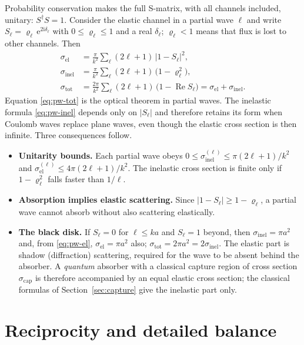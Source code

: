 \documentclass[11pt,a4paper]{book}
\numberwithin{equation}{chapter}
\newcommand{\ii}{\mathrm{i}}
\newcommand{\ee}{\mathrm{e}}
\newcommand{\Real}{\operatorname{Re}}
\begin{document}
Probability conservation makes the full S-matrix, with all channels included,
unitary: $S^\dagger S=1$. Consider the elastic channel in a partial wave $\ell$
and write $S_\ell=\varrho_\ell\,\ee^{2\ii\delta_\ell}$ with $0\le\varrho_\ell\le1$
and a real $\delta_\ell$; $\varrho_\ell<1$ means that flux is lost to other
channels. Then
\begin{align}
  \sigma_{\mathrm{el}}&=\frac{\pi}{k^2}\sum_\ell(2\ell+1)\,|1-S_\ell|^2,\label{eq:pw-el}\\
  \sigma_{\mathrm{inel}}&=\frac{\pi}{k^2}\sum_\ell(2\ell+1)\,\bigl(1-\varrho_\ell^2\bigr),\label{eq:pw-inel}\\
  \sigma_{\mathrm{tot}}&=\frac{2\pi}{k^2}\sum_\ell(2\ell+1)\,\bigl(1-\Real S_\ell\bigr)
  =\sigma_{\mathrm{el}}+\sigma_{\mathrm{inel}}.\label{eq:pw-tot}
\end{align}
Equation \eqref{eq:pw-tot} is the optical theorem in partial waves. The
inelastic formula \eqref{eq:pw-inel} depends only on $|S_\ell|$ and therefore
retains its form when Coulomb waves replace plane waves, even though the
elastic cross section is then infinite. Three consequences follow.
\begin{itemize}
  \item \textbf{Unitarity bounds.} Each partial wave obeys
        $0\le\sigma_{\mathrm{inel}}^{(\ell)}\le\pi(2\ell+1)/k^2$ and
        $\sigma_{\mathrm{el}}^{(\ell)}\le4\pi(2\ell+1)/k^2$. The inelastic cross
        section is finite only if $1-\varrho_\ell^2$ falls faster than $1/\ell$.
  \item \textbf{Absorption implies elastic scattering.} Since $|1-S_\ell|\ge1-\varrho_\ell$,
        a partial wave cannot absorb without also scattering elastically.
  \item \textbf{The black disk.} If $S_\ell=0$ for $\ell\le ka$ and $S_\ell=1$
        beyond, then $\sigma_{\mathrm{inel}}=\pi a^2$ and, from \eqref{eq:pw-el},
        $\sigma_{\mathrm{el}}=\pi a^2$ also; $\sigma_{\mathrm{tot}}=2\pi a^2=2\sigma_{\mathrm{inel}}$.
        The elastic part is shadow (diffraction) scattering, required for the
        wave to be absent behind the absorber. A \emph{quantum} absorber with a
        classical capture region of cross section $\sigma_{\mathrm{cap}}$ is
        therefore accompanied by an equal elastic cross section; the classical
        formulas of Section~\ref{sec:capture} give the inelastic part only.
\end{itemize}

\section{Reciprocity and detailed balance}
\end{document}
